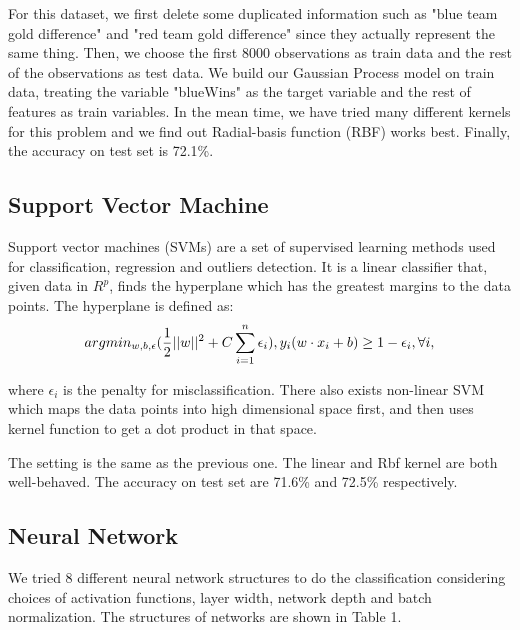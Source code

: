 \documentclass{article}
\begin{document}
For this dataset, we first delete some duplicated information such as "blue team gold difference" and "red team gold difference" since they actually represent the same thing. Then, we choose the first 8000 observations as train data and the rest of the observations as test data. We build our Gaussian Process model on train data, treating the variable "blueWins" as the target variable and the rest of features as train variables. In the mean time, we have tried many different kernels for this problem and we find out Radial-basis function (RBF) works best. Finally, the accuracy on test set is 72.1\%.

\subsection{Support Vector Machine}
Support vector machines (SVMs) are a set of supervised learning methods used for classification, regression and outliers detection. It is a linear classifier that, given data in $R^p$, finds the hyperplane which has the greatest margins to the data points. The hyperplane is defined as:
$$ argmin_{w,b,\epsilon}(\frac{1}{2}||w||^2+C\sum_{i=1}^{n}\epsilon_{i}), \space y_{i}(w \cdot x_{i}+b)\ge 1-\epsilon_{i},\space \forall i, $$

where $\epsilon_{i}$ is the penalty for misclassification. There also exists non-linear SVM which maps the data points into high dimensional space first, and then uses kernel function to get a dot product in that space.

The setting is the same as the previous one. The linear and Rbf kernel are both well-behaved. The accuracy on test set are 71.6\% and 72.5\% respectively.

\subsection{Neural Network}
We tried 8 different neural network structures to do the classification considering choices of activation functions, layer width, network depth and batch normalization. The structures of networks are shown in Table 1.
\end{document}
